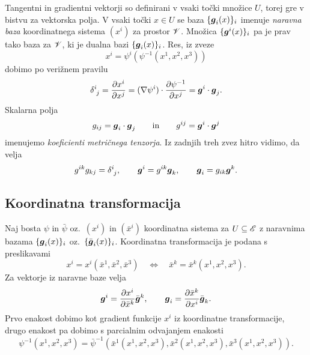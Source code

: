 Tangentni in gradientni vektorji so definirani v vsaki točki množice $U$, torej
gre v bistvu za vektorska polja. V vsaki točki $x\in U$ se baza $\{\boldsymbol g_i(x)\}_i$
imenuje \emph{naravna baza} koordinatnega sistema $(x^i)$ za prostor $\mathscr V$.
Množica $\{\boldsymbol g^i(x)\}_i$ pa je prav tako baza za $\mathscr V$, ki je dualna bazi $\{\boldsymbol g_i(x)\}_i$.
Res, iz zveze
\[ x^i=\psi^i(\psi^{-1}(x^1,x^2,x^3)) \]
dobimo po verižnem pravilu
\begin{equation} \label{e:gigj}
	\topbot{\delta}{i}{j}=\frac{\partial x^i}{\partial x^j}=
	(\nabla\psi^i)\cdot\frac{\partial\psi^{-1}}{\partial x^j}=\vek{g}^i\cdot\vek{g}_j.
\end{equation}
Skalarna polja
\[ g_{ij}=\boldsymbol g_i\cdot\boldsymbol g_j\qquad\textrm{in}\qquad g^{ij}=\boldsymbol g^i\cdot\boldsymbol g^j \]
imenujemo \emph{koeficienti metričnega tenzorja}. 
Iz zadnjih treh zvez hitro vidimo, da velja
\begin{equation} \label{e:relzag}
	g^{ik}g_{kj}=\topbot{\delta}{i}{j},\qquad \vek{g}^i=g^{ik}\vek{g}_k,\qquad \vek{g}_i=g_{ik}\vek{g}^k.
\end{equation}


\subsection{Koordinatna transformacija}


Naj bosta $\psi$ in $\bar{\psi}$ oz.~$(x^i)$ in $(\bar{x}^i)$ koordinatna sistema za
$U\subseteq\mathscr E$ z naravnima bazama $\{\boldsymbol g_i(x)\}_i$ oz.~$\{\bar{\boldsymbol g}_i(x)\}_i$.
Koordinatna transformacija je podana s preslikavami
\[
	x^i=x^i(\bar{x}^1,\bar{x}^2,\bar{x}^3)\quad\Longleftrightarrow\quad
	\bar{x}^k=\bar{x}^k(x^1,x^2,x^3).
\]
Za vektorje iz naravne baze velja
\begin{equation} \label{e:gtog}
	\boldsymbol g^i=\frac{\partial x^i}{\partial\bar{x}^k}\bar{\boldsymbol g}^k,\qquad
	\boldsymbol g_i=\frac{\partial\bar{x}^k}{\partial x^i}\bar{\boldsymbol g}_k.
\end{equation}
Prvo enakost dobimo kot gradient funkcije $x^i$ iz koordinatne transformacije,
drugo enakost pa dobimo s parcialnim odvajanjem enakosti
\[ 
	\psi^{-1}(x^1,x^2,x^3)=\bar{\psi}^{-1}(\bar{x}^1(x^1,x^2,x^3),
	\bar{x}^2(x^1,x^2,x^3),\bar{x}^3(x^1,x^2,x^3)).
\]

